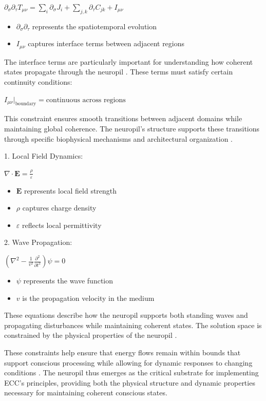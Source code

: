 \begin{refsection}
$\partial_\sigma\partial_\tau T_{\mu\nu} = \sum_i \partial_\sigma J_i + \sum_{j,k} \partial_\tau C_{jk} + I_{\mu\nu}$

\begin{itemize}
\item $\partial_\sigma\partial_\tau$ represents the spatiotemporal evolution
\item $I_{\mu\nu}$ captures interface terms between adjacent regions
\end{itemize}

The interface terms are particularly important for understanding how coherent states propagate through the neuropil \cite{Doron2017}. These terms must satisfy certain continuity conditions:

$I_{\mu\nu}|_{\text{boundary}} = \text{continuous across regions}$

This constraint ensures smooth transitions between adjacent domains while maintaining global coherence. The neuropil's structure supports these transitions through specific biophysical mechanisms and architectural organization \cite{Korogod2015}.

1. Local Field Dynamics:

$\nabla \cdot \mathbf{E} = \frac{\rho}{\varepsilon}$

\begin{itemize}
\item $\mathbf{E}$ represents local field strength
\item $\rho$ captures charge density
\item $\varepsilon$ reflects local permittivity \cite{Savtchenko2014}
\end{itemize}

2. Wave Propagation:

$(\nabla^2 - \frac{1}{v^2}\frac{\partial^2}{\partial t^2})\psi = 0$

\begin{itemize}
\item $\psi$ represents the wave function
\item $v$ is the propagation velocity in the medium \cite{Arbib1998}
\end{itemize}

These equations describe how the neuropil supports both standing waves and propagating disturbances while maintaining coherent states. The solution space is constrained by the physical properties of the neuropil \cite{Peters1991}.

These constraints help ensure that energy flows remain within bounds that support conscious processing while allowing for dynamic responses to changing conditions \cite{Sorra2000}. The neuropil thus emerges as the critical substrate for implementing ECC's principles, providing both the physical structure and dynamic properties necessary for maintaining coherent conscious states.


\end{refsection}
